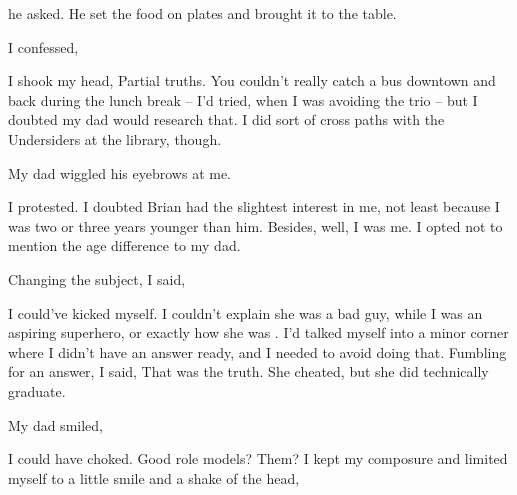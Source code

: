  he asked. He set the food on plates and brought it to the table.

 I confessed, 


I shook my head,  Partial truths. You couldn't really catch a bus downtown and back during the lunch break -- I'd tried, when I was avoiding the trio -- but I doubted my dad would research that. I did sort of cross paths with the Undersiders at the library, though.



 My dad wiggled his eyebrows at me.

 I protested. I doubted Brian had the slightest interest in me, not least because I was two or three years younger than him. Besides, well, I was me. I opted not to mention the age difference to my dad.

Changing the subject, I said, 


I could've kicked myself. I couldn't explain she was a bad guy, while I was an aspiring superhero, or exactly how she was . I'd talked myself into a minor corner where I didn't have an answer ready, and I needed to avoid doing that. Fumbling for an answer, I said,  That was the truth. She cheated, but she did technically graduate.

My dad smiled, 

I could have choked. Good role models? Them? I kept my composure and limited myself to a little smile and a shake of the head, 

